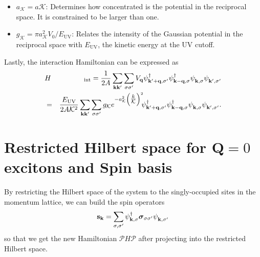 \documentclass[english,aps,prd,nofootinbib,twocolumn]{revtex4-1}
\begin{document}
\begin{itemize}
\item $a_{\mathcal{K}}=a\mathcal{K}$: Determines how concentrated is the potential in the reciprocal space. It is constrained to be larger than one.
\item $g_{\mathcal{K}}=\pi a_{\mathcal{K}}^{2}V_{0}/E_{\mathrm{UV}}$: Relates the intensity of the Gaussian potential in the reciprocal space with $E_{\mathrm{UV}}$, the kinetic energy at the UV cutoff.
\end{itemize}
Lastly, the interaction Hamiltonian can be expressed as
\begin{eqnarray}
&H&\!_{\mathrm{int}} =
\frac{1}{2A}
\sum_{\mathbf{k }\mathbf{k'}}
\sum_{\sigma \sigma'} 
V_{\mathbf{q}}
\psi_{\mathbf{k'+q,\sigma'}}^{\textcolor{black}{\dagger}}
\psi_{\mathbf{k -q,\sigma }}^{\textcolor{black}{\dagger}}
\psi_{\mathbf{k   ,\sigma }}^{\textcolor{white}{\dagger}}
\psi_{\mathbf{k'  ,\sigma'}}^{\textcolor{white}{\dagger}} \\
 &=& \nonumber \frac{E_{\mathrm{UV}}}{2A\mathcal{K}^{2}}
\sum_{\mathbf{k }\mathbf{k'}}
\sum_{\sigma \sigma'} 
g_{\mathcal{K}}
e^{-a_{\mathcal{K}}^{2}\left( \tfrac{k}{\mathcal{K}} \right)^{2}}
\!\! 
\psi_{\mathbf{k'+q,\sigma'}}^{\textcolor{black}{\dagger}}
\psi_{\mathbf{k -q,\sigma }}^{\textcolor{black}{\dagger}}
\psi_{\mathbf{k   ,\sigma }}^{\textcolor{white}{\dagger}}
\psi_{\mathbf{k'  ,\sigma'}}^{\textcolor{white}{\dagger}}.
\end{eqnarray}

\section{Restricted Hilbert space for $\mathbf{Q}=0$ excitons and Spin basis}
By restricting the Hilbert space of the system to the singly-occupied sites in the momentum lattice, we can build the spin operators 
\begin{equation}
\mathbf{s}_{\mathbf{k}}=\sum_{\sigma,\sigma'}
\psi_{\mathbf{k },\sigma}^{\textcolor{black}{\dagger}}
\boldsymbol{\sigma}_{\sigma\sigma'} 
\psi_{\mathbf{k },\sigma'}^{\textcolor{white}{\dagger}}
\end{equation}
so that we get the new Hamiltonian $\mathcal{P} H \mathcal{P}$ after projecting into the restricted Hilbert space. 
\end{document}
